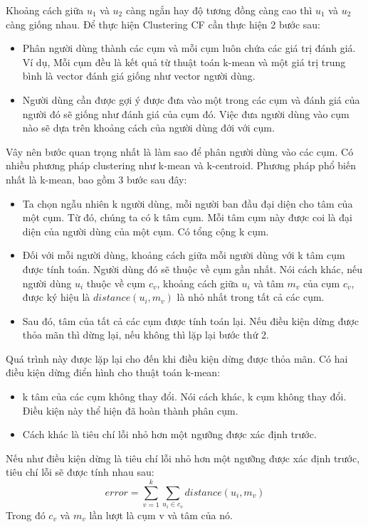Khoảng cách giữa $u_1$ và $u_2$ càng ngắn hay độ tương đồng càng cao thì $u_1$ và $u_2$ càng giống nhau. Để thực hiện Clustering \gls{CF} cần thực hiện 2 bước sau:
\begin{itemize}
    \item Phân người dùng thành các cụm và mỗi cụm luôn chứa các giá trị đánh giá. Ví dụ, Mỗi cụm đều là kết quả từ thuật toán k-mean và một giá trị trung bình là vector đánh giá giống như vector người dùng.
    \item Người dùng cần được gợi ý được đưa vào một trong các cụm và đánh giá của người đó sẽ giống như đánh giá của cụm đó. Việc đưa người dùng vào cụm nào sẽ dựa trên khoảng cách của người dùng đới với cụm.
\end{itemize}
Vây nên bước quan trọng nhất là làm sao để phân người dùng vào các cụm. Có nhiều phương pháp clustering như k-mean và k-centroid. Phương pháp phổ biến nhất là k-mean, bao gồm 3 bước sau đây:
\begin{itemize}
    \item Ta chọn ngẫu nhiên k người dùng, mỗi người ban đầu đại diện cho tâm của một cụm. Từ đó, chúng ta có k tâm cụm. Mỗi tâm cụm này được coi là đại diện của người dùng của một cụm. Có tổng cộng k cụm.
    \item Đối với mỗi người dùng, khoảng cách giữa mỗi người dùng với k tâm cụm được tính toán. Người dùng đó sẽ thuộc về cụm gần nhất. Nói cách khác, nếu người dùng $u_i$ thuộc về cụm $c_v$, khoảng cách giữa $u_i$ và tâm $m_v$ của cụm $c_v$, được ký hiệu là $distance(u_i, m_v)$ là nhỏ nhất trong tất cả các cụm.
    \item Sau đó, tâm của tất cả các cụm được tính toán lại. Nếu điều kiện dừng được thỏa mãn thì dừng lại, nếu không thì lặp lại bước thứ 2.
\end{itemize}
Quá trình này được lặp lại cho đến khi điều kiện dừng được thỏa mãn. Có hai điều kiện dừng điển hình cho thuật toán k-mean:
\begin{itemize}
    \item k tâm của các cụm không thay đổi. Nói cách khác, k cụm không thay đổi. Điều kiện này thể hiện đã hoàn thành phân cụm.
    \item Cách khác là tiêu chí lỗi nhỏ hơn một ngưỡng được xác định trước.
\end{itemize}
Nếu như điều kiện dừng là tiêu chí lỗi nhỏ hơn một ngưỡng được xác định trước, tiêu chí lỗi sẽ được tính nhau sau:
$$ error = \underset{v=1}{\overset{k}{\sum}} \underset{u_i \in c_v}{\sum} distance(u_i,m_v) $$
Trong đó $c_v$ và $m_v$ lần lượt là cụm v và tâm của nó.

